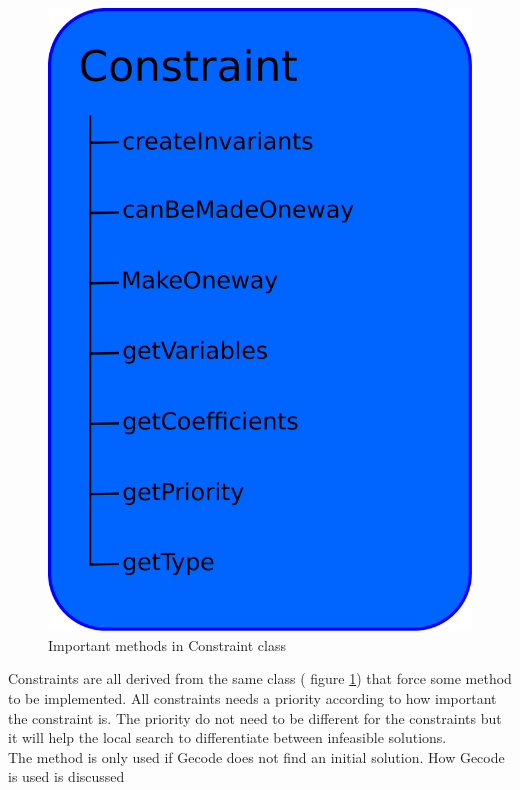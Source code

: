 \begin{figure}[!b]
\begin{center}
 \includegraphics[width=\linewidth/2]{constraint.pdf} \caption{Important methods in Constraint 
class}\label{fig_constraint}
\end{center} 
\end{figure}
Constraints are all derived from the same class ( figure \ref{fig_constraint}) that force some method 
to be implemented. All constraints needs a priority according to how important the constraint is. The priority do not 
need to be different for the constraints but it will help the local search to differentiate between infeasible  
solutions. \\ 
The method  is only used if Gecode does not find an initial solution. How Gecode is used is discussed 
